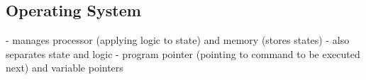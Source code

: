 %
%
%
%
%
%
%

\subsection{Operating System}
\label{operating_system_heading}

- manages processor (applying logic to state) and memory (stores states)
- also separates state and logic
- program pointer (pointing to command to be executed next) and variable pointers
